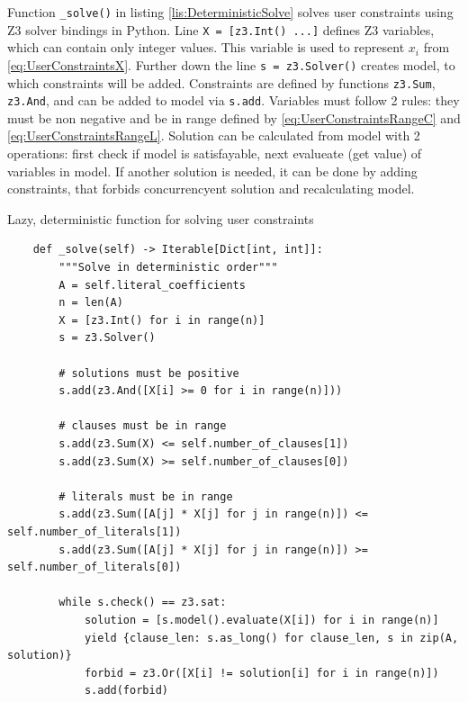 Function \texttt{_solve()} in listing \ref{lis:DeterministicSolve} solves user constraints using Z3 solver bindings in Python. Line 
\texttt{X = [z3.Int() ...]}
defines Z3 variables, which can contain only integer values. This variable is used to represent $x_i$ from \ref{eq:UserConstraintsX}. Further down the line 
\texttt{s = z3.Solver()} 
creates model, to which constraints will be added. Constraints are defined by functions
\texttt{z3.Sum}, 
\texttt{z3.And}, 
and can be added to model via
\texttt{s.add}.
Variables must follow 2 rules: they must be non negative and be in range defined by \ref{eq:UserConstraintsRangeC} and \ref{eq:UserConstraintsRangeL}. Solution can be calculated from model with 2 operations: first check if model is satisfayable, next evalueate (get value) of variables in model. If another solution is needed, it can be done by adding constraints, that forbids concurrencyent solution and recalculating model.


\begin{listing}[H]
  \caption{Lazy, deterministic function for solving user constraints}
  \label{lis:DeterministicSolve}
\begin{verbatim}
    def _solve(self) -> Iterable[Dict[int, int]]:
        """Solve in deterministic order"""
        A = self.literal_coefficients
        n = len(A)
        X = [z3.Int() for i in range(n)]
        s = z3.Solver()

        # solutions must be positive
        s.add(z3.And([X[i] >= 0 for i in range(n)]))

        # clauses must be in range
        s.add(z3.Sum(X) <= self.number_of_clauses[1])
        s.add(z3.Sum(X) >= self.number_of_clauses[0])

        # literals must be in range
        s.add(z3.Sum([A[j] * X[j] for j in range(n)]) <= self.number_of_literals[1])
        s.add(z3.Sum([A[j] * X[j] for j in range(n)]) >= self.number_of_literals[0])

        while s.check() == z3.sat:
            solution = [s.model().evaluate(X[i]) for i in range(n)]
            yield {clause_len: s.as_long() for clause_len, s in zip(A, solution)}
            forbid = z3.Or([X[i] != solution[i] for i in range(n)])
            s.add(forbid)
\end{verbatim}
\end{listing}

